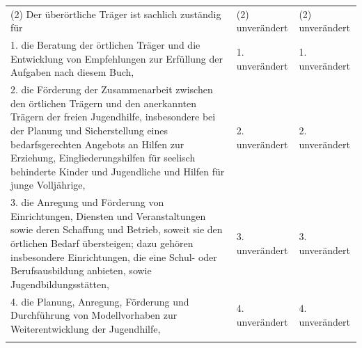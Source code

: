 \documentclass[10pt,a4paper,landscape]{article}
\begin{document}
\begin{longtable}{|L{8.2cm}|L{8.2cm}|L{8.2cm}|}
\hhline{|---|}
(2) Der überörtliche Träger ist sachlich  \newline zuständig für & (2) unverändert & (2) unverändert \\
\hhline{|---|}
1.  \newline die Beratung der örtlichen Träger und die  \newline Entwicklung von Empfehlungen zur  \newline Erfüllung der Aufgaben nach diesem Buch, & 1. unverändert & 1. unverändert \\
\hhline{|---|}
2.  \newline die Förderung der Zusammenarbeit  \newline zwischen den örtlichen Trägern und den  \newline anerkannten Trägern der freien  \newline Jugendhilfe, insbesondere bei der Planung  \newline und Sicherstellung eines bedarfsgerechten  \newline Angebots an Hilfen zur Erziehung,  \newline Eingliederungshilfen für seelisch  \newline behinderte Kinder und Jugendliche und  \newline Hilfen für junge Volljährige, & 2. unverändert & 2. unverändert \\
\hhline{|---|}
3.  \newline die Anregung und Förderung von  \newline Einrichtungen, Diensten und  \newline Veranstaltungen sowie deren Schaffung  \newline und Betrieb, soweit sie den örtlichen Bedarf  \newline übersteigen; dazu gehören insbesondere  \newline Einrichtungen, die eine Schul- oder  \newline Berufsausbildung anbieten, sowie  \newline Jugendbildungsstätten, & 3. unverändert & 3. unverändert \\
\hhline{|---|}
4.  \newline die Planung, Anregung, Förderung und  \newline Durchführung von Modellvorhaben zur  \newline Weiterentwicklung der Jugendhilfe, & 4. unverändert & 4. unverändert \\
\hhline{|---|}

\end{longtable}
\end{document}
